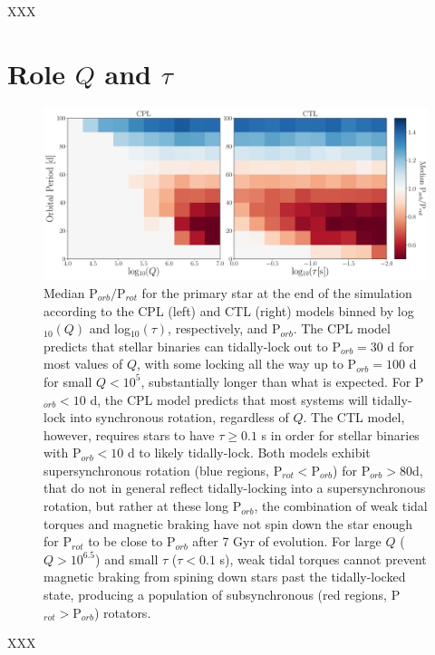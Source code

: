 \documentclass[twocolumn]{aastex61}
\begin{document}
XXX

\section{Role $Q$ and $\tau$}

\begin{figure}[ht]
	\includegraphics[width=\textwidth]{../Plots/qTauPorbRatioHist.pdf}
   \caption{Median P$_{orb}/$P$_{rot}$ for the primary star at the end of the simulation according to the CPL (left) and CTL (right) models binned by log$_{10}(Q)$ and log$_{10}(\tau)$, respectively, and P$_{orb}$.  The CPL model predicts that stellar binaries can tidally-lock out to P$_{orb} = 30$ d for most values of $Q$, with some locking all the way up to P$_{orb} = 100$ d for small $Q < 10^5$, substantially longer than what is expected.  For P$_{orb} < 10$ d, the CPL model predicts that most systems will tidally-lock into synchronous rotation, regardless of $Q$.  The CTL model, however, requires stars to have $\tau \geq 0.1$ s in order for stellar binaries with P$_{orb} < 10$ d to likely tidally-lock.  Both models exhibit supersynchronous rotation (blue regions, P$_{rot} < $P$_{orb}$) for P$_{orb} > 80$d, that do not in general reflect tidally-locking into a supersynchronous rotation, but rather at these long P$_{orb}$, the combination of weak tidal torques and magnetic braking have not spin down the star enough for P$_{rot}$ to be close to P$_{orb}$ after 7 Gyr of evolution. For large $Q$ ($Q > 10^{6.5}$) and small $\tau$ ($\tau < 0.1$ s), weak tidal torques cannot prevent magnetic braking from spining down stars past the tidally-locked state, producing a population of subsynchronous (red regions, P$_{rot} > $P$_{orb}$) rotators.}%
    \label{fig:qTauLock}%
\end{figure}

XXX
\end{document}
